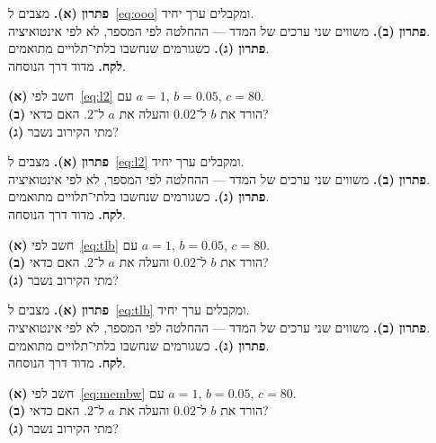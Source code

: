 \begin{keybox}[frametitle={פתרון 3},nobreak=true]
\textbf{פתרון (א).} מצבים ל~\eqref{eq:ooo} ומקבלים ערך יחיד.\\[2pt]
\textbf{פתרון (ב).} משווים שני ערכים של המדד — ההחלטה לפי המספר, לא לפי אינטואיציה.\\[2pt]
\textbf{פתרון (ג).} כשגורמים שנחשבו בלתי־תלויים מתואמים.\\[2pt]
\textbf{לקח.} מדוד דרך הנוסחה.
\end{keybox}


\begin{exbox}[frametitle={תרגיל 4 — \en{inclusive}}]
\textbf{(א)} חשב לפי~\eqref{eq:l2} עם $a=1$, $b=0.05$, $c=80$.\\[3pt]
\textbf{(ב)} הורד את $b$ ל־$0.02$ והעלה את $a$ ל־$2$. האם כדאי?\\[3pt]
\textbf{(ג)} מתי הקירוב נשבר?
\end{exbox}

\begin{keybox}[frametitle={פתרון 4},nobreak=true]
\textbf{פתרון (א).} מצבים ל~\eqref{eq:l2} ומקבלים ערך יחיד.\\[2pt]
\textbf{פתרון (ב).} משווים שני ערכים של המדד — ההחלטה לפי המספר, לא לפי אינטואיציה.\\[2pt]
\textbf{פתרון (ג).} כשגורמים שנחשבו בלתי־תלויים מתואמים.\\[2pt]
\textbf{לקח.} מדוד דרך הנוסחה.
\end{keybox}


\begin{exbox}[frametitle={תרגיל 5 — \en{VPN}}]
\textbf{(א)} חשב לפי~\eqref{eq:tlb} עם $a=1$, $b=0.05$, $c=80$.\\[3pt]
\textbf{(ב)} הורד את $b$ ל־$0.02$ והעלה את $a$ ל־$2$. האם כדאי?\\[3pt]
\textbf{(ג)} מתי הקירוב נשבר?
\end{exbox}

\begin{keybox}[frametitle={פתרון 5},nobreak=true]
\textbf{פתרון (א).} מצבים ל~\eqref{eq:tlb} ומקבלים ערך יחיד.\\[2pt]
\textbf{פתרון (ב).} משווים שני ערכים של המדד — ההחלטה לפי המספר, לא לפי אינטואיציה.\\[2pt]
\textbf{פתרון (ג).} כשגורמים שנחשבו בלתי־תלויים מתואמים.\\[2pt]
\textbf{לקח.} מדוד דרך הנוסחה.
\end{keybox}


\begin{exbox}[frametitle={תרגיל 6 — \en{bandwidth}}]
\textbf{(א)} חשב לפי~\eqref{eq:membw} עם $a=1$, $b=0.05$, $c=80$.\\[3pt]
\textbf{(ב)} הורד את $b$ ל־$0.02$ והעלה את $a$ ל־$2$. האם כדאי?\\[3pt]
\textbf{(ג)} מתי הקירוב נשבר?
\end{exbox}

